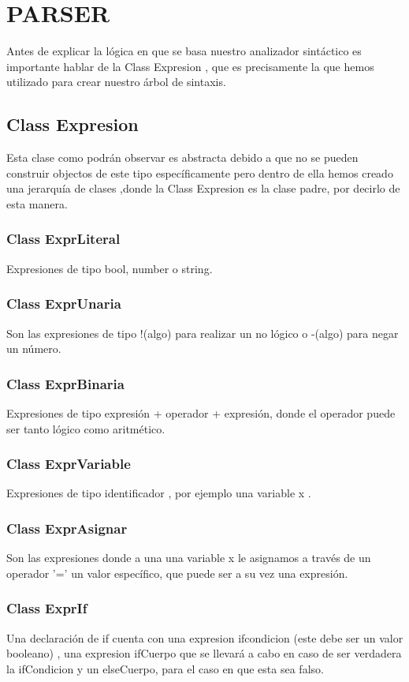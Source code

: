 \documentclass[a4paper,12pt]{article}
\begin{document}
\section{PARSER}\label{sec:ent}

Antes de explicar la lógica en que se basa nuestro analizador sintáctico es importante hablar de la Class Expresion , que es precisamente la que hemos utilizado para crear nuestro árbol de sintaxis.

\subsection{ Class Expresion}\label{sub:center}
Esta clase como podrán observar es abstracta debido a que no se pueden construir objectos de este tipo específicamente pero dentro de ella hemos creado una jerarquía de clases ,donde la Class Expresion es la clase padre, por decirlo de esta manera.

\subsubsection[short]{Class ExprLiteral}
Expresiones de tipo bool, number o string.
\subsubsection[short]{Class ExprUnaria}
Son las expresiones de tipo !(algo) para realizar un no lógico o -(algo) para negar un número.
\subsubsection[short]{Class ExprBinaria}
Expresiones de tipo expresión + operador + expresión,  donde el operador puede ser tanto lógico como aritmético.
\subsubsection[short]{Class ExprVariable}
Expresiones de tipo identificador , por ejemplo una variable x .
\subsubsection[short]{Class ExprAsignar}
Son las expresiones donde a una una variable x le asignamos a través de un operador '=' un valor específico,  que puede ser a su vez una expresión.
\subsubsection[short]{Class ExprIf}
Una declaración de if cuenta con una expresion ifcondicion (este debe ser un valor booleano) , una expresion ifCuerpo que se llevará a cabo en caso de ser verdadera la ifCondicion y un elseCuerpo, para  el caso en que esta sea falso.
\end{document}
